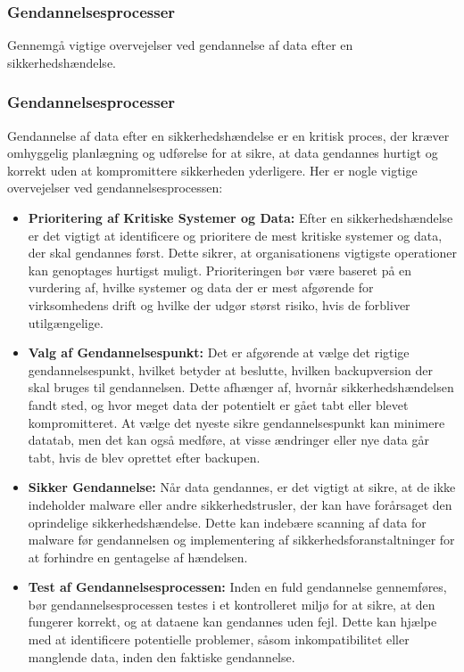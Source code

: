 \subsubsection{Gendannelsesprocesser}
Gennemgå vigtige overvejelser ved gendannelse af data efter en sikkerhedshændelse.

\subsubsection{Gendannelsesprocesser}
Gendannelse af data efter en sikkerhedshændelse er en kritisk proces, der kræver omhyggelig planlægning og udførelse for at sikre, at data gendannes hurtigt og korrekt uden at kompromittere sikkerheden yderligere. Her er nogle vigtige overvejelser ved gendannelsesprocessen:

\begin{itemize}
	\item \textbf{Prioritering af Kritiske Systemer og Data:} Efter en sikkerhedshændelse er det vigtigt at identificere og prioritere de mest kritiske systemer og data, der skal gendannes først. Dette sikrer, at organisationens vigtigste operationer kan genoptages hurtigst muligt. Prioriteringen bør være baseret på en vurdering af, hvilke systemer og data der er mest afgørende for virksomhedens drift og hvilke der udgør størst risiko, hvis de forbliver utilgængelige.
	
	\item \textbf{Valg af Gendannelsespunkt:} Det er afgørende at vælge det rigtige gendannelsespunkt, hvilket betyder at beslutte, hvilken backupversion der skal bruges til gendannelsen. Dette afhænger af, hvornår sikkerhedshændelsen fandt sted, og hvor meget data der potentielt er gået tabt eller blevet kompromitteret. At vælge det nyeste sikre gendannelsespunkt kan minimere datatab, men det kan også medføre, at visse ændringer eller nye data går tabt, hvis de blev oprettet efter backupen.
	
	\item \textbf{Sikker Gendannelse:} Når data gendannes, er det vigtigt at sikre, at de ikke indeholder malware eller andre sikkerhedstrusler, der kan have forårsaget den oprindelige sikkerhedshændelse. Dette kan indebære scanning af data for malware før gendannelsen og implementering af sikkerhedsforanstaltninger for at forhindre en gentagelse af hændelsen.
	
	\item \textbf{Test af Gendannelsesprocessen:} Inden en fuld gendannelse gennemføres, bør gendannelsesprocessen testes i et kontrolleret miljø for at sikre, at den fungerer korrekt, og at dataene kan gendannes uden fejl. Dette kan hjælpe med at identificere potentielle problemer, såsom inkompatibilitet eller manglende data, inden den faktiske gendannelse.
	

\end{itemize}
